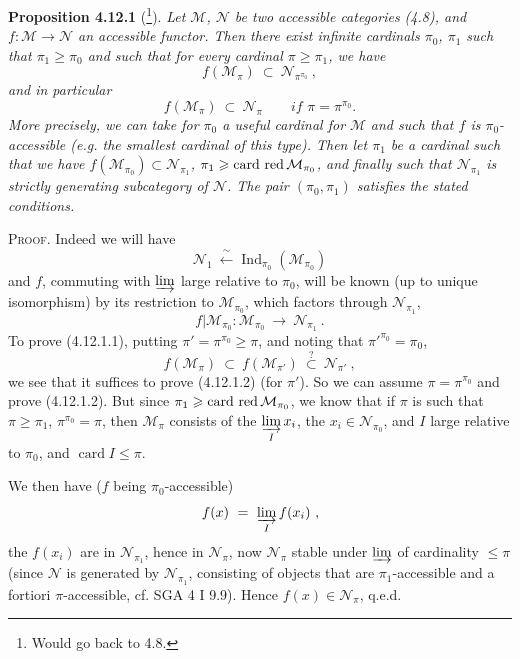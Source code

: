 \documentclass[11pt]{article}
\newcommand{\printedpage}[1]{\marginpar{\footnotesize p.~#1}}
\newcommand{\msp}[1]{\marginpar{\footnotesize [#1]}}
\newcommand{\cardred}{\operatorname{card}\,\text{\upshape red}\,}
\newcommand{\Ind}{\operatorname{Ind}}
\begin{document}
\textbf{Proposition 4.12.1} (\footnote{Would go back to 4.8.}). \textit{Let $\mathcal{M}$, $\mathcal{N}$ be two accessible categories (4.8), and $f : \mathcal{M} \longrightarrow \mathcal{N}$ an accessible functor. Then there exist infinite cardinals $\pi_0$, $\pi_1$ such that $\pi_1 \geqslant \pi_0$ and such that for every cardinal $\pi \geqslant \pi_1$, we have}
\[
f(\mathcal{M}_\pi) \ \subset \ \mathcal{N}_{\pi^{\pi_0}} \ , \tag*{(4.12.1)} %
\]
\textit{and in particular}
\[
f(\mathcal{M}_\pi) \ \subset \ \mathcal{N}_\pi \qquad \textit{if } \pi = \pi^{\pi_0}. \tag*{(4.12.1.2)}
\]
\textit{More precisely, we can take for $\pi_0$ a useful cardinal for $\mathcal{M}$} \msp{page 274} \textit{and such that $f$ is $\pi_0$-accessible (e.g. the smallest cardinal of this type). Then let $\pi_1$ be a cardinal such that we have $f(\mathcal{M}_{\pi_0}) \subset \mathcal{N}_{\pi_1}$, $\pi_1 \geqslant \cardred \mathcal{M}_{\pi_0}$, and finally such that $\mathcal{N}_{\pi_1}$ is} \textit{strictly generating subcategory of $\mathcal{N}$. The pair $(\pi_0,\pi_1)$ satisfies the stated conditions.}

\textsc{Proof}. Indeed we will have
\[
\mathcal{N}_1 \ \xleftarrow{\ \sim\ } \Ind_{\pi_0}(\mathcal{M}_{\pi_0})
\]
and $f$, commuting with $\varinjlim$ large relative to $\pi_0$, will be known (up to unique isomorphism) by its restriction to $\mathcal{M}_{\pi_0}$, which factors through $\mathcal{N}_{\pi_1}$,
\[
f|\mathcal{M}_{\pi_0} : \mathcal{M}_{\pi_0} \ \longrightarrow \ \mathcal{N}_{\pi_1} \ .
\]
To prove (4.12.1.1), putting $\pi' = \pi^{\pi_0} \geqslant \pi$, and noting that $\pi'^{\pi_0} = \pi_0$,
\[
f(\mathcal{M}_\pi) \ \subset \ f(\mathcal{M}_{\pi'}) \ \overset{?}{\subset} \ \mathcal{N}_{\pi'} \ ,
\]
\printedpage{103}
we see that it suffices to prove (4.12.1.2) (for $\pi'$). So we can assume $\pi = \pi^{\pi_0}$ and prove (4.12.1.2). But since $\pi_1 \geqslant \cardred \mathcal{M}_{\pi_0}$, we know that if $\pi$ is such that $\pi \geqslant \pi_1$, $\pi^{\pi_0} = \pi$, then $\mathcal{M}_\pi$ consists of the $\varinjlim\limits_{I} x_i$, the $x_i \in \mathcal{N}_{\pi_0}$, and $I$ large relative to $\pi_0$, and $\operatorname{card} I \leqslant \pi$.

\msp{page 275}

We then have ($f$ being $\pi_0$-accessible)
\[
f(x) \ = \ \varinjlim_{I} f(x_i) \ ,
\]
the $f(x_i)$ are in $\mathcal{N}_{\pi_1}$, hence in $\mathcal{N}_\pi$, now $\mathcal{N}_\pi$ stable under $\varinjlim$ of cardinality $\leqslant \pi$ (since $\mathcal{N}$ is generated by $\mathcal{N}_{\pi_1}$, consisting of objects that are $\pi_1$-accessible and a fortiori $\pi$-accessible, cf. SGA 4 I 9.9). Hence $f(x) \in \mathcal{N}_\pi$, q.e.d.
\end{document}
